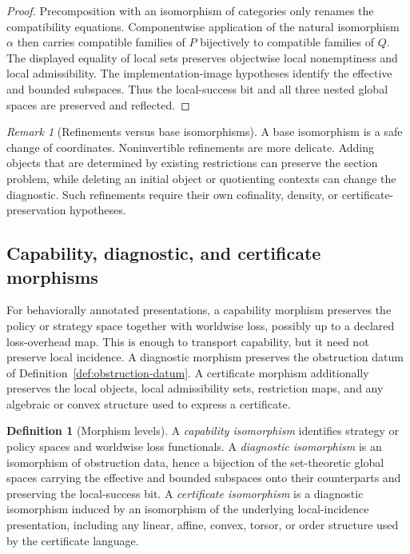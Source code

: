 \documentclass[11pt]{article}
\theoremstyle{plain}
\theoremstyle{definition}
\newtheorem{definition}[theorem]{Definition}
\theoremstyle{remark}
\newtheorem{remark}[theorem]{Remark}
\begin{document}
\begin{proof}
Precomposition with an isomorphism of categories only renames the compatibility
equations. Componentwise application of the natural isomorphism $\alpha$ then
carries compatible families of $P$ bijectively to compatible families of $Q$.
The displayed equality of local sets preserves objectwise local nonemptiness and
local admissibility. The implementation-image hypotheses identify the effective
and bounded subspaces. Thus the local-success bit and all three nested global
spaces are preserved and reflected.
\end{proof}

\begin{remark}[Refinements versus base isomorphisms]
A base isomorphism is a safe change of coordinates. Noninvertible refinements are
more delicate. Adding objects that are determined by existing restrictions can
preserve the section problem, while deleting an initial object or quotienting
contexts can change the diagnostic. Such refinements require their own
cofinality, density, or certificate-preservation hypotheses.
\end{remark}

\subsection{Capability, diagnostic, and certificate morphisms}

For behaviorally annotated presentations, a capability morphism preserves the
policy or strategy space together with worldwise loss, possibly up to a declared
loss-overhead map. This is enough to transport capability, but it need not
preserve local incidence. A diagnostic morphism preserves the obstruction datum
of Definition~\ref{def:obstruction-datum}. A certificate morphism additionally
preserves the local objects, local admissibility sets, restriction maps, and any
algebraic or convex structure used to express a certificate.

\begin{definition}[Morphism levels]
\label{def:morphism-levels}
A \emph{capability isomorphism} identifies strategy or policy spaces and
worldwise loss functionals. A \emph{diagnostic isomorphism} is an isomorphism of
obstruction data, hence a bijection of the set-theoretic global spaces carrying
the effective and bounded subspaces onto their counterparts and preserving the
local-success bit. A \emph{certificate isomorphism} is a diagnostic isomorphism
induced by an isomorphism of the underlying local-incidence presentation,
including any linear, affine, convex, torsor, or order structure used by the
certificate language.
\end{definition}
\end{document}
